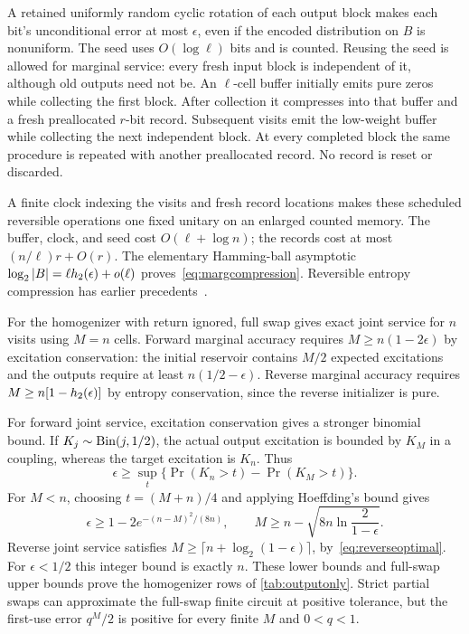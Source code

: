 A retained uniformly random cyclic rotation of each output block makes each bit's unconditional error at most $\epsilon$, even if the encoded distribution on $B$ is nonuniform. The seed uses $O(\log\ell)$ bits and is counted. Reusing the seed is allowed for marginal service: every fresh input block is independent of it, although old outputs need not be. An $\ell$-cell buffer initially emits pure zeros while collecting the first block. After collection it compresses into that buffer and a fresh preallocated $r$-bit record. Subsequent visits emit the low-weight buffer while collecting the next independent block. At every completed block the same procedure is repeated with another preallocated record. No record is reset or discarded.

A finite clock indexing the visits and fresh record locations makes these scheduled reversible operations one fixed unitary on an enlarged counted memory. The buffer, clock, and seed cost $O(\ell+\log n)$; the records cost at most $(n/\ell)r+O(r)$. The elementary Hamming-ball asymptotic $\log_2|B|=\ell h_2(\epsilon)+o(\ell)$ proves~\eqref{eq:margcompression}.  Reversible entropy compression has earlier precedents~\cite{sv}. 

For the homogenizer with return ignored, full swap gives exact joint service for $n$ visits using $M=n$ cells. Forward marginal accuracy requires $M\ge n(1-2\epsilon)$ by excitation conservation: the initial reservoir contains $M/2$ expected excitations and the outputs require at least $n(1/2-\epsilon)$. Reverse marginal accuracy requires $M\ge n[1-h_2(\epsilon)]$ by entropy conservation, since the reverse initializer is pure.

For forward joint service, excitation conservation gives a stronger binomial bound. If $K_j\sim\operatorname{Bin}(j,1/2)$, the actual output excitation is bounded by $K_M$ in a coupling, whereas the target excitation is $K_n$. Thus
\begin{equation}
 \epsilon\ge\sup_t\{\Pr(K_n>t)-\Pr(K_M>t)\}.
\end{equation}
For $M<n$, choosing $t=(M+n)/4$ and applying Hoeffding's bound gives
\begin{equation}
 \epsilon\ge1-2e^{-(n-M)^2/(8n)},\qquad
 M\ge n-\sqrt{8n\ln\frac2{1-\epsilon}}.
 \label{eq:jointbinomial}
\end{equation}
Reverse joint service satisfies $M\ge\lceil n+\log_2(1-\epsilon)\rceil$, by~\eqref{eq:reverseoptimal}. For $\epsilon<1/2$ this integer bound is exactly $n$. These lower bounds and full-swap upper bounds prove the homogenizer rows of \cref{tab:outputonly}. Strict partial swaps can approximate the full-swap finite circuit at positive tolerance, but the first-use error $q^M/2$ is positive for every finite $M$ and $0<q<1$.

